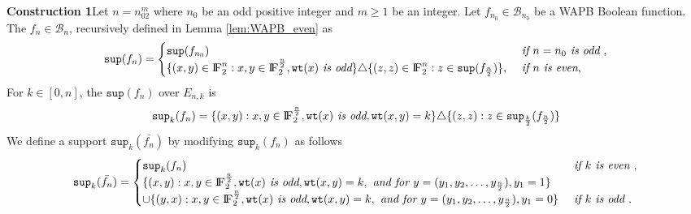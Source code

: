 \documentclass{article}[12pt]
\newenvironment{Construction}[1]{\par\noindent\textbf{Construction 1}\space#1}{}
\newcommand{\FF}{{\rm I\!F}}
\newcommand{\CB}{\mathcal{B}}
\newcommand{\wt}{\mathtt{wt}}
\newcommand{\spt}{\mathtt{sup}}
\begin{document}
\begin{Construction}
	Let $n = n_02^m$ where $n_0$ be an odd positive integer and $m \geq 1$ be an integer. Let $f_{n_0} \in \CB_{n_0}$ be a WAPB Boolean function. The $f_n \in \CB_n$, recursively defined in Lemma \ref{lem:WAPB_even} as
	$$\spt(f_n)=
	\begin{cases} 
	\spt(f_{n_0}) & \textit{ if } n = n_0 \textit{ is odd }, \\
	\{(x,y) \in \FF_2^n : x,y \in \FF_2^{\frac{n}{2}}, \wt(x) \textit{ is odd}\} \triangle \{(z,z) \in \FF_2^n : z \in \spt(f_{\frac{n}{2}})\}, & \textit{ if } n \textit{ is even},
	\end{cases}$$
	For $k \in [0,n]$, the $\spt(f_n)$ over $E_{n,k}$ is
	\begin{align*}
		\spt_k(f_n) = \{(x,y) : x,y \in \FF_2^{\frac{n}{2}}, \wt(x) \textit{ is odd}, \wt(x,y) = k \} \triangle \{(z,z) : z \in \spt_\frac{k}{2}(f_{\frac{n}{2}})\}
	\end{align*}
	 We define a support $\spt_k(\bar{f_n})$ by modifying $\spt_k(f_n)$ as follows
	\begin{equation}
		\spt_k(\bar{f_n})=
		\begin{cases}
		    \spt_k(f_n) & \textit{ if } k \textit{ is even }, \\
		    \{(x,y) : x,y \in \FF_2^{\frac{n}{2}}, \wt(x) \textit{ is odd}, \wt(x,y) = k, \textit{ and for } y= (y_1,y_2,\ldots,y_\frac{n}{2}), y_1 = 1 \} \\ \cup   \{(y,x) : x,y \in \FF_2^{\frac{n}{2}}, \wt(x) \textit{ is odd}, \wt(x,y) = k, \textit{ and for } y= (y_1,y_2,\ldots,y_\frac{n}{2}), y_1 = 0\} & \textit{ if } k \textit{ is odd }.		        
		\end{cases}
	\end{equation}
\end{Construction}
\end{document}
